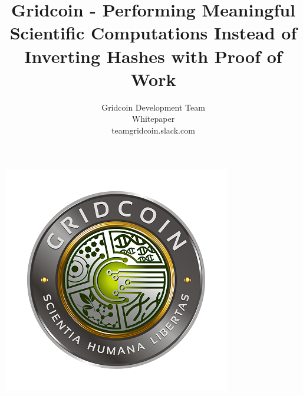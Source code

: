 \documentclass[10pt,a4paper]{article}
\begin{document}
\pagestyle{headings}




\title{Gridcoin - Performing Meaningful Scientific Computations Instead of Inverting Hashes with Proof of Work}

\author{Gridcoin Development Team\\
Whitepaper\\
teamgridcoin.slack.com\\}


\maketitle
\thispagestyle{empty}



\begin{center}
\includegraphics{figures/gridcoin-art-small}
\end{center}



















\newpage




\end{document}
